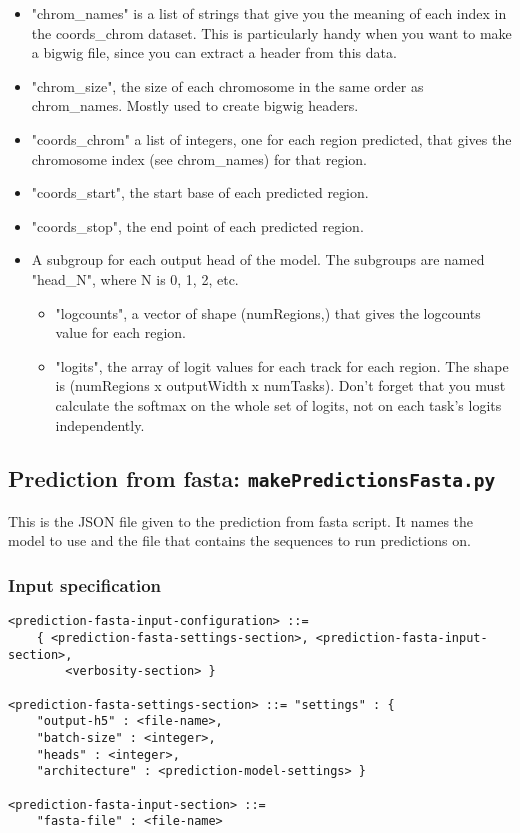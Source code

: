 \documentclass{article}
\begin{document}
\begin{itemize}
    \item "chrom\_names" is a list of strings that give you the meaning of each index in the coords\_chrom dataset. This is particularly handy when you want to make a bigwig file, since you can extract a header from this data. 
    \item "chrom\_size", the size of each chromosome in the same order as chrom\_names. Mostly used to create bigwig headers. 
    \item "coords\_chrom" a list of integers, one for each region predicted, that gives the chromosome index (see chrom\_names) for that region. 
    \item "coords\_start", the start base of each predicted region. 
    \item "coords\_stop", the end point of each predicted region.
    \item A subgroup for each output head of the model. The subgroups are named "head\_N", where N is 0, 1, 2, etc. 
        \begin{itemize}
            \item "logcounts", a vector of shape (numRegions,) that gives the logcounts value for each region. 
            \item "logits", the array of logit values for each track for each region. The shape is (numRegions x outputWidth x numTasks). Don't forget that you must calculate the softmax on the whole set of logits, not on each task's logits independently.
        \end{itemize} 

\end{itemize}


\newpage

\subsection{Prediction from fasta: \texttt{makePredictionsFasta.py}}

This is the JSON file given to the prediction from fasta script. It names the model to use and the file that contains the sequences to run predictions on.

\subsubsection{Input specification}

\begin{lstlisting}
<prediction-fasta-input-configuration> ::=
    { <prediction-fasta-settings-section>, <prediction-fasta-input-section>,
        <verbosity-section> }

<prediction-fasta-settings-section> ::= "settings" : {
    "output-h5" : <file-name>,
    "batch-size" : <integer>,
    "heads" : <integer>,
    "architecture" : <prediction-model-settings> }

<prediction-fasta-input-section> ::=
    "fasta-file" : <file-name>
\end{lstlisting}
\end{document}
